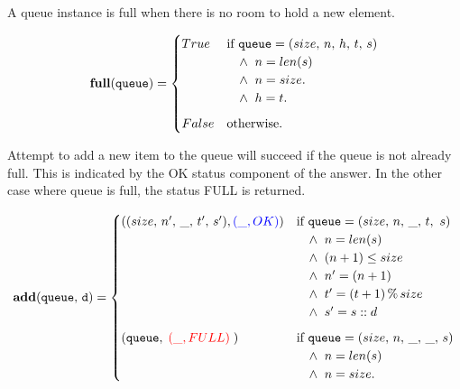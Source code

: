 \documentclass[10pt]{article}
\begin{document}
    A queue instance is full when there is no room to hold a new element.

    \[
        \mathtt{\mathbf{full}(queue)} = \begin{cases} True & \mbox{if  } \mathtt{queue} = (size, \, n, \, h, \, t, \, s) \\
            &\hspace*{10pt}\wedge\;\; n = len(s) \\
            & \hspace*{10pt}\wedge\;\;  n = size. \\
            & \hspace*{10pt}\wedge\;\;  h = t. \vspace*{6pt}\\ 
        False & \mbox{otherwise}. \end{cases} 
    \]
    
    Attempt to add a new item to the queue will succeed if the queue is not already full. This is indicated by the OK status component of the answer. In the other case where queue is full, the status FULL is returned.

    \[
        \mathtt{\mathbf{add}(queue,\, d)} = \begin{cases} ((size, \, n', \, \_, \, t', \, s'),  {\textcolor{blue}{(\_, OK)}}) & \mbox{if } \mathtt{queue} = (size, \, n, \, \_, \, t,\, \, s)\\ & \hspace*{10pt}\wedge\; \; n = len(s)
        \\ & \hspace*{10pt}\wedge\; \; (n+1) \leq size
        \\ & \hspace*{10pt}\wedge\; \; n' = (n+1) 
        \\ & \hspace*{10pt}\wedge\; \; t' = (t + 1) \,\%\, size 
        \\ & \hspace*{10pt}\wedge\; \; s' = s::d\vspace*{6pt}\\ 
        (\mathtt{queue},\;{\textcolor{red}{(\_, FULL)}} \; ) & \mbox{if } \mathtt{queue} = (size, \, n, \, \_, \, \_, \, s)\\
        & \hspace*{10pt}\wedge\; \; n = len(s)\\
        & \hspace*{10pt}\wedge\; \; n = size. \end{cases} 
    \]
\end{document}
